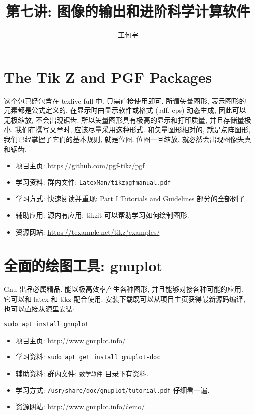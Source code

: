 \documentclass[a4paper]{ctexart}
\title{第七讲: 图像的输出和进阶科学计算软件}
\author{王何宇}
\date{}
\begin{document}
\maketitle
\pagestyle{empty}

\section{The Tik Z and PGF Packages}

这个包已经包含在 texlive-full 中. 只需直接使用即可. 所谓矢量图形, 表示图形的元素都是公式定义的,
在显示时由显示软件或格式 (pdf, eps) 动态生成, 因此可以无极缩放, 不会出现锯齿.
所以矢量图形具有极高的显示和打印质量, 并且存储量极小. 我们在撰写文章时, 应该尽量采用这种形式.
和矢量图形相对的, 就是点阵图形, 我们已经掌握了它们的基本规则, 就是位图. 位图一旦缩放,
就必然会出现图像失真和锯齿. 

\begin{itemize}
\item 项目主页: \url{https://github.com/pgf-tikz/pgf}
\item 学习资料: 群内文件: \verb|LatexMan/tikzpgfmanual.pdf|
\item 学习方式: 快速阅读并重现: Part I Tutorials and Guidelines 部分的全部例子.
\item 辅助应用: 源内有应用: tikzit 可以帮助学习如何绘制图形.
\item 资源网站: \url{https://texample.net/tikz/examples/}
\end{itemize}

\section{全面的绘图工具: gnuplot}

Gnu 出品必属精品. 能以极高效率产生各种图形, 并且能够对接各种可能的应用. 它可以和 latex 和 tikz
配合使用. 安装下载既可以从项目主页获得最新源码编译, 也可以直接从源里安装:
\begin{verbatim}
sudo apt install gnuplot
\end{verbatim}

\begin{itemize}
\item 项目主页: \url{http://www.gnuplot.info/}
\item 学习资料: \verb|sudo apt get install gnuplot-doc|
\item 辅助资料: 群内文件: \verb|数学软件| 目录下有资料.
\item 学习方式: \verb|/usr/share/doc/gnuplot/tutorial.pdf| 仔细看一遍.
\item 资源网站: \url{http://www.gnuplot.info/demo/}
\end{itemize}
\end{document}
